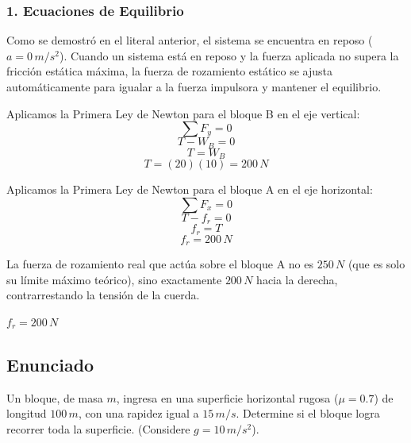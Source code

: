\documentclass[12pt, a4paper]{article}
\begin{document}
\subsubsection*{1. Ecuaciones de Equilibrio}
Como se demostró en el literal anterior, el sistema se encuentra en reposo ($a = 0\,\si{m/s^2}$). Cuando un sistema está en reposo y la fuerza aplicada no supera la fricción estática máxima, la fuerza de rozamiento estático se ajusta automáticamente para igualar a la fuerza impulsora y mantener el equilibrio.

Aplicamos la Primera Ley de Newton para el bloque B en el eje vertical:
$$ \sum F_y = 0 $$
$$ T - W_B = 0 $$
$$ T = W_B $$
$$ T = (20)(10) = 200\,\si{N} $$

Aplicamos la Primera Ley de Newton para el bloque A en el eje horizontal:
$$ \sum F_x = 0 $$
$$ T - f_r = 0 $$
$$ f_r = T $$
$$ f_r = 200\,\si{N} $$

La fuerza de rozamiento real que actúa sobre el bloque A no es $250\,\si{N}$ (que es solo su límite máximo teórico), sino exactamente $200\,\si{N}$ hacia la derecha, contrarrestando la tensión de la cuerda.

\begin{tcolorbox}[colback=green!5!white, colframe=green!50!black, title=Respuesta Final]
\centering \Large $f_r = 200\,\si{N}$
\end{tcolorbox}

\newpage

\subsection*{Enunciado}
Un bloque, de masa $m$, ingresa en una superficie horizontal rugosa ($\mu = 0.7$) de longitud $100 \, \si{m}$, con una rapidez igual a $15 \, \si{m/s}$. Determine si el bloque logra recorrer toda la superficie. (Considere $g = 10 \, \si{m/s^2}$).

\begin{center}
\end{center}
\end{document}
